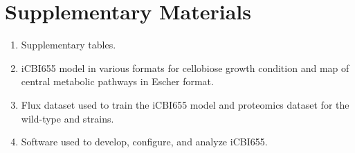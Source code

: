\section*{Supplementary Materials}
\begin{enumerate}
    \item Supplementary tables. \label{sm:figures}
    \item iCBI655 model in various formats for cellobiose growth condition and map of central metabolic pathways in Escher format. \label{sm:model}
    \item Flux dataset used to train the iCBI655 model and proteomics dataset for the wild-type and  strains. \label{sm:datasets}
    \item Software used to develop, configure, and analyze iCBI655. \label{sm:code}
\end{enumerate}


